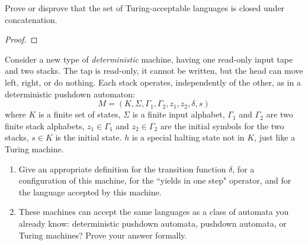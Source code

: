 \documentclass[12pt]{jhwhw}
\begin{document}
\problem{}

	Prove or disprove that the set of Turing-acceptable languages is closed under concatenation.

\solution

	\begin{proof}

	\end{proof}

\problem{}

	Consider a new type of \textit{deterministic} machine, having one read-only input tape
	and two stacks. The tap is read-only, it cannot be written, but the head can move left, right,
	or do nothing. Each stack operates, independently of the other, as in a deterministic pushdown
	automaton:
	$$
		M = (K,\Sigma, \Gamma_1, \Gamma_2, z_1, z_2, \delta, s)
	$$
	where $K$ is a finite set of states, $\Sigma$ is a finite input alphabet,
	$\Gamma_1$ and $\Gamma_2$ are two finite stack alphabets, $z_1\in \Gamma_1$ and $z_2\in \Gamma_2$
	are the initial symbols for the two stacks, $s\in K$ is the initial state. $h$ is a special
	halting state not in $K$, just like a Turing machine.

	\begin{enumerate}
		\item Give an appropriate definition for the transition function $\delta$, for a 
			configuration of this machine, for the ``yields in one step" operator,
			and for the language accepted by this machine.
		\item These machines can accept the same languages as a class of automata you already know:
			deterministic pushdown automata, pushdown automata, or Turing machines? Prove
			your answer formally.
	\end{enumerate}

\solution
\end{document}
